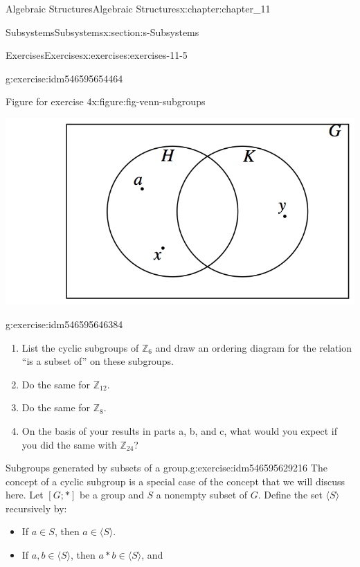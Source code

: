 \documentclass[oneside,10pt,]{book}
\numberwithin{equation}{section}
\begin{document}
\begin{chapterptx}{Algebraic Structures}{}{Algebraic Structures}{}{}{x:chapter:chapter_11}
\begin{sectionptx}{Subsystems}{}{Subsystems}{}{}{x:section:s-Subsystems}
\begin{exercises-subsection}{Exercises}{}{Exercises}{}{}{x:exercises:exercises-11-5}
\begin{divisionexercise}{4}{}{}{g:exercise:idm546595654464}
\begin{enumerate}[label=(\alph*)]
\end{enumerate}
%
\begin{figureptx}{Figure for exercise 4}{x:figure:fig-venn-subgroups}{}%
\begin{image}{0.165}{0.67}{0.165}%
\includegraphics[width=\linewidth]{images/fig-venn-subgroups.png}
\end{image}%
\tcblower
\end{figureptx}%
\end{divisionexercise}%
\begin{divisionexercise}{5}{}{}{g:exercise:idm546595646384}%
%
\begin{enumerate}[label=(\alph*)]
\item{}List the cyclic subgroups of \(\mathbb{Z}_6\) and draw an ordering diagram for the relation ``is a subset of'' on these subgroups.%
\item{}Do the same for \(\mathbb{Z}_{12}\).%
\item{}Do the same for \(\mathbb{Z}_8\).%
\item{}On the basis of your results in parts a, b, and c, what would you expect if you did the same with \(\mathbb{Z}_{24}\)?%
\end{enumerate}
%
\end{divisionexercise}%
\begin{divisionexercise}{6}{Subgroups generated by subsets of a group.}{}{g:exercise:idm546595629216}%
The concept of a cyclic subgroup is a special case of the concept that we will discuss here. Let \([G; * ]\) be a group and \(S\) a nonempty subset of \(G\). Define the set \(\langle S \rangle\) recursively by:%
\begin{itemize}[label=\textbullet]
\item{}If \(a\in S\), then \(a\in  \langle S \rangle\).%
\item{}If \(a, b \in \langle S \rangle\), then \(a * b \in \langle S \rangle\), and%

\end{itemize}
\end{divisionexercise}
\end{exercises-subsection}
\end{sectionptx}
\end{chapterptx}
\end{document}
